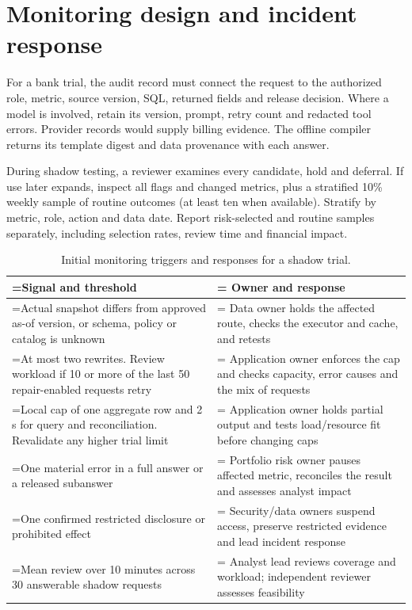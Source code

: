 \documentclass[11pt,a4paper,onecolumn,oneside]{rho-class/rho}
\begin{document}
\clearpage

\section{Monitoring design and incident response}

\label{sec:s11}

For a bank trial, the audit record must connect the request to the authorized role, metric, source version, SQL, returned fields and release decision. Where a model is involved, retain its version, prompt, retry count and redacted tool errors. Provider records would supply billing evidence. The offline compiler returns its template digest and data provenance with each answer.

During shadow testing, a reviewer examines every candidate, hold and deferral. If use later expands, inspect all flags and changed metrics, plus a stratified 10\% weekly sample of routine outcomes (at least ten when available). Stratify by metric, role, action and data date. Report risk-selected and routine samples separately, including selection rates, review time and financial impact.

{\setlength{\tabcolsep}{6pt}
\renewcommand{\arraystretch}{1.35}
\begin{table}[H]
\centering
\small
\begin{tabularx}{\linewidth}{@{}>{\hsize=0.580\hsize\linewidth=\hsize\RaggedRight\arraybackslash}X>{\hsize=1.420\hsize\linewidth=\hsize\RaggedRight\arraybackslash}X@{}}
\toprule
\textbf{Signal and threshold} & \textbf{Owner and response} \\ \midrule
Actual snapshot differs from approved as-of version, or schema, policy or catalog is unknown & Data owner holds the affected route, checks the executor and cache, and retests \\
At most two rewrites. Review workload if 10 or more of the last 50 repair-enabled requests retry & Application owner enforces the cap and checks capacity, error causes and the mix of requests \\
Local cap of one aggregate row and 2 s for query and reconciliation. Revalidate any higher trial limit & Application owner holds partial output and tests load/resource fit before changing caps \\
One material error in a full answer or a released subanswer & Portfolio risk owner pauses affected metric, reconciles the result and assesses analyst impact \\
One confirmed restricted disclosure or prohibited effect & Security/data owners suspend access, preserve restricted evidence and lead incident response \\
Mean review over 10 minutes across 30 answerable shadow requests & Analyst lead reviews coverage and workload; independent reviewer assesses feasibility \\
\bottomrule
\end{tabularx}
\caption{Initial monitoring triggers and responses for a shadow trial.}
\end{table}
}
\end{document}

